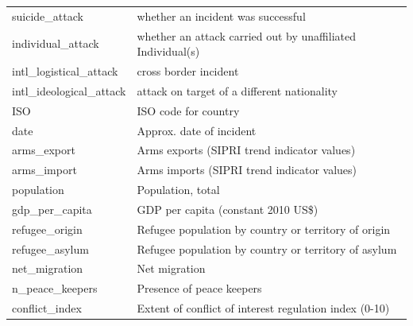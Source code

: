 \documentclass[11pt,oneside,a4paper]{reedthesis}
\begin{document}
\begin{table}[H]
\begin{tabular}[t]{ll}
suicide\_attack & whether an incident was successful\\
individual\_attack & whether an attack carried out by unaffiliated Individual(s)\\
\addlinespace
intl\_logistical\_attack & cross border incident\\
intl\_ideological\_attack & attack on target of a different nationality\\
ISO & ISO code for country\\
date & Approx. date of incident\\
arms\_export & Arms exports (SIPRI trend indicator values)\\
\addlinespace
arms\_import & Arms imports (SIPRI trend indicator values)\\
population & Population, total\\
gdp\_per\_capita & GDP per capita (constant 2010 US\$)\\
refugee\_origin & Refugee population by country or territory of origin\\
refugee\_asylum & Refugee population by country or territory of asylum\\
\addlinespace
net\_migration & Net migration\\
n\_peace\_keepers & Presence of peace keepers\\
conflict\_index & Extent of conflict of interest regulation index (0-10)\\
\bottomrule
\end{tabular}
\end{table}
\end{document}
